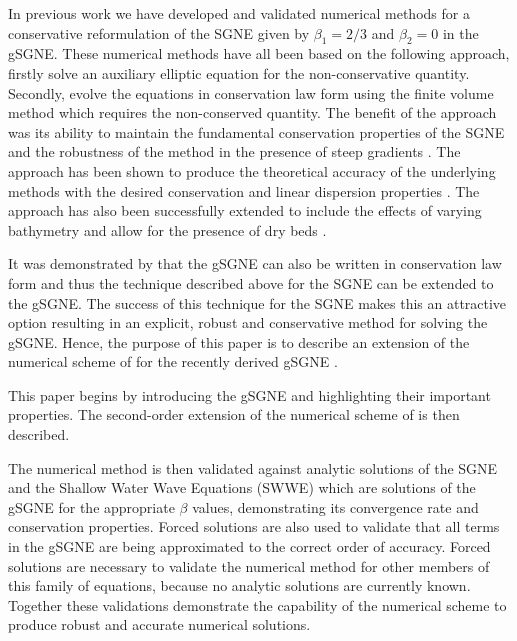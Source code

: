 \documentclass[10pt]{elsarticle}
\begin{document}
In previous work we have developed and validated numerical methods for a conservative reformulation of the SGNE \cite{Zoppou-2014,Zoppou-etal-2016,Zoppou-etal-2017,Pitt-2019} given by $\beta_1 = 2/3$ and $\beta_2 =0$ in the gSGNE. These numerical methods have all been based on the following approach, firstly solve an auxiliary elliptic equation for the non-conservative quantity. Secondly, evolve the equations in conservation law form using the finite volume method which requires the non-conserved quantity. The benefit of the approach was its ability to maintain the fundamental conservation properties of the SGNE \cite{Pitt-2019} and the robustness of the method in the presence of steep gradients \cite{Pitt-2018-61}. The approach has been shown to produce the theoretical accuracy of the underlying methods \cite{Zoppou-etal-2017,Pitt-2019} with the desired conservation and linear dispersion properties \cite{Pitt-2019}. The approach has also been successfully extended to include the effects of varying bathymetry and allow for the presence of dry beds \cite{Pitt-2019}.  

It was demonstrated by \citet{Clamond-Dutykh-2018-237} that the gSGNE can also be written in conservation law form and thus the technique described above for the SGNE can be extended to the gSGNE. The success of this technique for the SGNE makes this an attractive option resulting in an explicit, robust and conservative method for solving the gSGNE. Hence, the purpose of this paper is to describe an extension of the numerical scheme of \citet{Zoppou-etal-2017} for the recently derived gSGNE \cite{Clamond-Dutykh-2018-237}. 

This paper begins by introducing the gSGNE and highlighting their important properties. The second-order extension of the numerical scheme of \citet{Zoppou-etal-2017} is then described. 

The numerical method is then validated against analytic solutions of the SGNE and the Shallow Water Wave Equations (SWWE) which are solutions of the gSGNE for the appropriate $\beta$ values, demonstrating its convergence rate and conservation properties. Forced solutions are also used to validate that all terms in the gSGNE are being approximated to the correct order of accuracy. Forced solutions are necessary to validate the numerical method for other members of this family of equations, because no analytic solutions are currently known. Together these validations demonstrate the capability of the numerical scheme to produce robust and accurate numerical solutions. 
\end{document}
